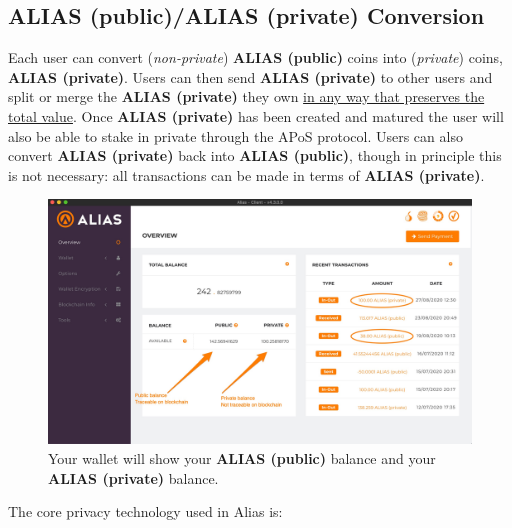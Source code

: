 \subsection{ALIAS (public)/ALIAS (private) Conversion}
Each user can convert (\textit{non-private}) \textbf{ALIAS (public)} coins into 
(\textit{private}) coins, \textbf{ALIAS (private)}. Users can then send \textbf{ALIAS (private)} 
to other users and split or merge the \textbf{ALIAS (private)} they own \underline{in any 
way that preserves the total value}. Once \textbf{ALIAS (private)} has been created
and matured the user will also be able to stake in private through the APoS
protocol. Users can also convert \textbf{ALIAS (private)} back into \textbf{ALIAS (public)}, 
though in principle this is not necessary: all transactions can be made in 
terms of \textbf{ALIAS (private)}.



\begin{figure}[ht]
	\centering
	\includegraphics[width=\textwidth]{Images/wallet_alias_1.jpg}
	\caption{Your wallet will show your \textbf{ALIAS (public)} balance and your 
		\textbf{ALIAS (private)} balance.}
\end{figure}



\noindent
The core privacy technology used in Alias is:


